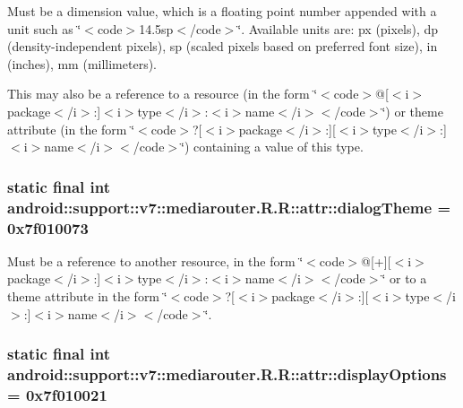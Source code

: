 Must be a dimension value, which is a floating point number appended with a unit such as \char`\"{}$<$code$>$14.5sp$<$/code$>$\char`\"{}. Available units are: px (pixels), dp (density-independent pixels), sp (scaled pixels based on preferred font size), in (inches), mm (millimeters). 

This may also be a reference to a resource (in the form \char`\"{}$<$code$>$@\mbox{[}$<$i$>$package$<$/i$>$:\mbox{]}$<$i$>$type$<$/i$>$:$<$i$>$name$<$/i$>$$<$/code$>$\char`\"{}) or theme attribute (in the form \char`\"{}$<$code$>$?\mbox{[}$<$i$>$package$<$/i$>$:\mbox{]}\mbox{[}$<$i$>$type$<$/i$>$:\mbox{]}$<$i$>$name$<$/i$>$$<$/code$>$\char`\"{}) containing a value of this type. \hypertarget{classandroid_1_1support_1_1v7_1_1mediarouter_1_1_r_1_1attr_1a18fc08bf8e638fb45289188dfec320}{
\subsubsection[{dialogTheme}]{\setlength{\rightskip}{0pt plus 5cm}static final int android::support::v7::mediarouter.R.R::attr::dialogTheme = 0x7f010073}}
\label{classandroid_1_1support_1_1v7_1_1mediarouter_1_1_r_1_1attr_1a18fc08bf8e638fb45289188dfec320}


Must be a reference to another resource, in the form \char`\"{}$<$code$>$@\mbox{[}+\mbox{]}\mbox{[}$<$i$>$package$<$/i$>$:\mbox{]}$<$i$>$type$<$/i$>$:$<$i$>$name$<$/i$>$$<$/code$>$\char`\"{} or to a theme attribute in the form \char`\"{}$<$code$>$?\mbox{[}$<$i$>$package$<$/i$>$:\mbox{]}\mbox{[}$<$i$>$type$<$/i$>$:\mbox{]}$<$i$>$name$<$/i$>$$<$/code$>$\char`\"{}. \hypertarget{classandroid_1_1support_1_1v7_1_1mediarouter_1_1_r_1_1attr_8821de0497518dd88060a87db8ebb64b}{
\subsubsection[{displayOptions}]{\setlength{\rightskip}{0pt plus 5cm}static final int android::support::v7::mediarouter.R.R::attr::displayOptions = 0x7f010021}}
\label{classandroid_1_1support_1_1v7_1_1mediarouter_1_1_r_1_1attr_8821de0497518dd88060a87db8ebb64b}


